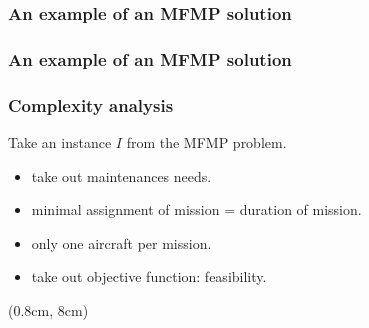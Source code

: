 \begin{frame}[t]
\frametitle{\textbf{An example of an MFMP solution}}
  
\end{frame}

\begin{frame}[t]
\frametitle{\textbf{An example of an MFMP solution}}
  
\end{frame}

\begin{frame}
\frametitle{\textbf{Complexity analysis}}
  
  Take an instance $I$ from the MFMP problem.
  \pause
  \begin{itemize}[<+->]
    \item take out maintenances needs.
    \item minimal assignment of mission = duration of mission.
    \item only one aircraft per mission.
    \item take out objective function: feasibility.
  \end{itemize}
  
  \begin{block}{}
  \end{block}
  \begin{textblock*}{1.1\textwidth}(0.8cm, 8cm)
    \begin{flushleft}
    \end{flushleft}
  \end{textblock*}
\end{frame}



